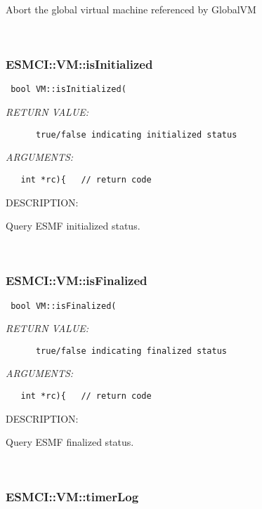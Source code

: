 {      Abort the global virtual machine referenced by GlobalVM
   
 
\mbox{}\hrulefill\
 
\subsubsection [ESMCI::VM::isInitialized] {ESMCI::VM::isInitialized}


  
\begin{verbatim} bool VM::isInitialized(\end{verbatim}{\em RETURN VALUE:}
\begin{verbatim}      true/false indicating initialized status\end{verbatim}{\em ARGUMENTS:}
\begin{verbatim}   int *rc){   // return code\end{verbatim}
{\sf DESCRIPTION:\\ }


      Query ESMF initialized status.
   
 
\mbox{}\hrulefill\
 
\subsubsection [ESMCI::VM::isFinalized] {ESMCI::VM::isFinalized}


  
\begin{verbatim} bool VM::isFinalized(\end{verbatim}{\em RETURN VALUE:}
\begin{verbatim}      true/false indicating finalized status\end{verbatim}{\em ARGUMENTS:}
\begin{verbatim}   int *rc){   // return code\end{verbatim}
{\sf DESCRIPTION:\\ }


      Query ESMF finalized status.
   
 
\mbox{}\hrulefill\
 
\subsubsection [ESMCI::VM::timerLog] {ESMCI::VM::timerLog}


}
